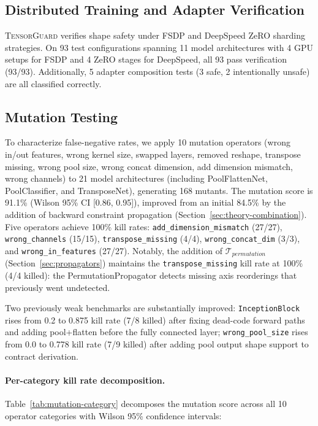 \documentclass[11pt]{article}
\begin{document}
\subsection{Distributed Training and Adapter Verification}

\textsc{TensorGuard} verifies shape safety under FSDP and DeepSpeed
ZeRO sharding strategies.  On 93 test configurations spanning
11 model architectures with 4 GPU setups for FSDP and 4 ZeRO stages
for DeepSpeed, all 93 pass verification (93/93).  Additionally, 5 adapter
composition tests (3 safe, 2 intentionally unsafe) are all
classified correctly.

\subsection{Mutation Testing}

To characterize false-negative rates, we apply 10 mutation operators
(wrong in/out features, wrong kernel size, swapped layers,
removed reshape, transpose missing, wrong pool size,
wrong concat dimension, add dimension mismatch, wrong channels)
to 21 model architectures
(including PoolFlattenNet, PoolClassifier, and TransposeNet), generating
168 mutants.  The mutation score is 91.1\% (Wilson 95\% CI
[0.86, 0.95]), improved from an initial 84.5\% by the addition of
backward constraint propagation (Section~\ref{sec:theory-combination}).
Five operators achieve 100\% kill rates:
\texttt{add\_dimension\_mismatch} (27/27),
\texttt{wrong\_channels} (15/15),
\texttt{transpose\_missing} (4/4),
\texttt{wrong\_concat\_dim} (3/3), and
\texttt{wrong\_in\_features} (27/27).
Notably, the addition of $\mathcal{T}_{\mathit{permutation}}$
(Section~\ref{sec:propagators}) maintains the
\texttt{transpose\_missing} kill rate at 100\% (4/4 killed):
the PermutationPropagator detects missing axis reorderings
that previously went undetected.

Two previously weak benchmarks are substantially improved:
\texttt{InceptionBlock} rises from 0.2 to 0.875 kill rate
(7/8 killed) after fixing dead-code forward paths and adding
pool+flatten before the fully connected layer;
\texttt{wrong\_pool\_size} rises from 0.0 to 0.778 kill rate
(7/9 killed) after adding pool output shape support to contract
derivation.

\paragraph{Per-category kill rate decomposition.}
Table~\ref{tab:mutation-category} decomposes the mutation score across
all 10 operator categories with Wilson 95\% confidence intervals:
\end{document}
